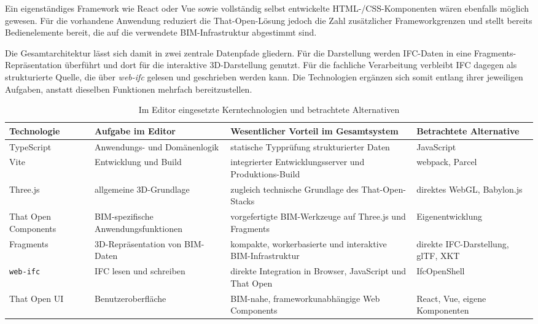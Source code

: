 Ein eigenständiges Framework wie React oder Vue sowie vollständig selbst entwickelte
HTML-/CSS-Komponenten wären ebenfalls möglich gewesen. Für die vorhandene Anwendung reduziert die
That-Open-Lösung jedoch die Zahl zusätzlicher Frameworkgrenzen und stellt bereits Bedienelemente
bereit, die auf die verwendete BIM-Infrastruktur abgestimmt sind.

Die Gesamtarchitektur lässt sich damit in zwei zentrale Datenpfade gliedern. Für die Darstellung
werden IFC-Daten in eine Fragments-Repräsentation überführt und dort für die interaktive
3D-Darstellung genutzt. Für die fachliche Verarbeitung verbleibt IFC dagegen als strukturierte
Quelle, die über \textit{web-ifc} gelesen und geschrieben werden kann. Die Technologien ergänzen
sich somit entlang ihrer jeweiligen Aufgaben, anstatt dieselben Funktionen mehrfach bereitzustellen.

\begin{table}[htbp]
  \centering
  \small
  \renewcommand{\arraystretch}{1.3}
  \begin{tabularx}{\textwidth}{@{}|p{}|p{}|X|p{}|@{}}
    \hline
    \textbf{Technologie} & \textbf{Aufgabe im Editor} & \textbf{Wesentlicher Vorteil im Gesamtsystem} & \textbf{Betrachtete Alternative} \\
    \hline
    TypeScript & Anwendungs- und Domänenlogik & statische Typprüfung strukturierter Daten & JavaScript \\
    \hline
    Vite & Entwicklung und Build & integrierter Entwicklungsserver und Produktions-Build & webpack, Parcel \\
    \hline
    Three.js & allgemeine 3D-Grundlage & zugleich technische Grundlage des That-Open-Stacks & direktes WebGL, Babylon.js \\
    \hline
    That Open Components & BIM-spezifische Anwendungsfunktionen & vorgefertigte BIM-Werkzeuge auf Three.js und Fragments & Eigenentwicklung \\
    \hline
    Fragments & 3D-Repräsentation von BIM-Daten & kompakte, workerbasierte und interaktive BIM-Infrastruktur & direkte IFC-Darstellung, glTF, XKT \\
    \hline
    \texttt{web-ifc} & IFC lesen und schreiben & direkte Integration in Browser, JavaScript und That Open & IfcOpenShell \\
    \hline
    That Open UI & Benutzeroberfläche & BIM-nahe, frameworkunabhängige Web Components & React, Vue, eigene Komponenten \\
    \hline
  \end{tabularx}
  \caption{Im Editor eingesetzte Kerntechnologien und betrachtete Alternativen}
  \label{tab:technologien-editor}
\end{table}
\FloatBarrier

